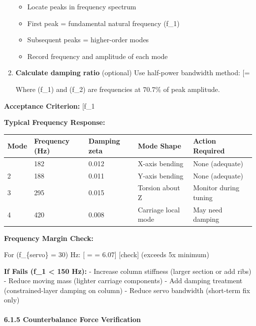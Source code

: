 \documentclass[
]{article}
\providecommand{\tightlist}{%
  \setlength{\itemsep}{0pt}\setlength{\parskip}{0pt}}
\begin{document}
\begin{enumerate}
  \begin{itemize}
  \tightlist
  \item
    Locate peaks in frequency spectrum
  \item
    First peak = fundamental natural frequency (f\_1)
  \item
    Subsequent peaks = higher-order modes
  \item
    Record frequency and amplitude of each mode
  \end{itemize}
\item
  \textbf{Calculate damping ratio} (optional) Use half-power bandwidth
  method: {[}\zeta = \frac{f_2 - f_1}{2 f_n}{]}

  Where (f\_1) and (f\_2) are frequencies at 70.7\% of peak amplitude.
\end{enumerate}

\textbf{Acceptance Criterion:} {[}f\_1 
\text{ Hz (for 30 Hz servo bandwidth)}{]}

\textbf{Typical Frequency Response:}

{\def\LTcaptype{} %
\begin{longtable}[]{@{}lllll@{}}
\toprule\noalign{}
Mode & Frequency (Hz) & Damping zeta & Mode Shape & Action Required \\
\midrule\noalign{}
\endhead
\bottomrule\noalign{}
\endlastfoot
1 & 182 & 0.012 & X-axis bending & None (adequate) \\
2 & 188 & 0.011 & Y-axis bending & None (adequate) \\
3 & 295 & 0.015 & Torsion about Z & Monitor during tuning \\
4 & 420 & 0.008 & Carriage local mode & May need damping \\
\end{longtable}
}

\textbf{Frequency Margin Check:}

For (f\_\{servo\} = 30) Hz: {[} =  =
6.07{]} {[}check{]} (exceeds 5x minimum)

\textbf{If Fails (f\_1 \textless{} 150 Hz):} - Increase column stiffness
(larger section or add ribs) - Reduce moving mass (lighter carriage
components) - Add damping treatment (constrained-layer damping on
column) - Reduce servo bandwidth (short-term fix only)

\paragraph{6.1.5 Counterbalance Force
Verification}\label{counterbalance-force-verification}
\end{document}
